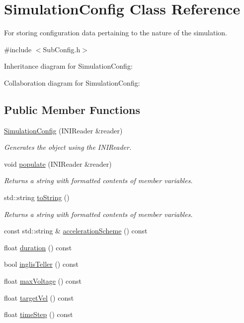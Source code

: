 \hypertarget{classSimulationConfig}{\section{Simulation\+Config Class Reference}
\label{classSimulationConfig}
}


For storing configuration data pertaining to the nature of the simulation.  




{\ttfamily \#include $<$Sub\+Config.\+h$>$}



Inheritance diagram for Simulation\+Config\+:


Collaboration diagram for Simulation\+Config\+:
\subsection*{Public Member Functions}
\begin{DoxyCompactItemize}
\item 
\hyperlink{classSimulationConfig_a0b91e3fd066d781d7e4ba02bcd4aa168}{Simulation\+Config} (I\+N\+I\+Reader \&reader)
\begin{DoxyCompactList}\small\item\em Generates the object using the I\+N\+I\+Reader. \end{DoxyCompactList}\item 
void \hyperlink{classSimulationConfig_a1600504534ec0b054f858107397f2cc6}{populate} (I\+N\+I\+Reader \&reader)
\begin{DoxyCompactList}\small\item\em Returns a string with formatted contents of member variables. \end{DoxyCompactList}\item 
std\+::string \hyperlink{classSimulationConfig_a9f4f56e9187054743fc80d6cfe9d732d}{to\+String} ()
\begin{DoxyCompactList}\small\item\em Returns a string with formatted contents of member variables. \end{DoxyCompactList}\item 
const std\+::string \& \hyperlink{classSimulationConfig_a4cd82a305fd1239440071fa97b590425}{acceleration\+Scheme} () const 
\item 
float \hyperlink{classSimulationConfig_adc6a92413c183b4942e5c4ed6980f621}{duration} () const 
\item 
bool \hyperlink{classSimulationConfig_ab3b5ac91cd29ef766ee1c94717ef8746}{inglis\+Teller} () const 
\item 
float \hyperlink{classSimulationConfig_abf3f16cdfb1515b38a9e1f782b2d1c27}{max\+Voltage} () const 
\item 
float \hyperlink{classSimulationConfig_a1cdc1572a4e20c57d80158ebb9c279a9}{target\+Vel} () const 
\item 
float \hyperlink{classSimulationConfig_ac54b98a6aa42433ee3ddfd43455ab63b}{time\+Step} () const 
\end{DoxyCompactItemize}
